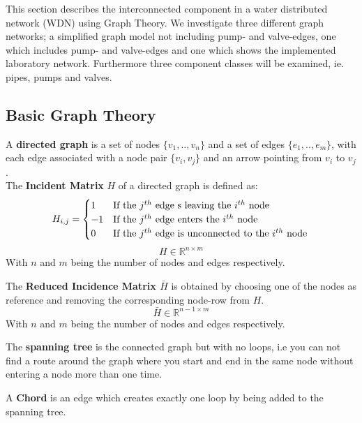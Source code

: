 This section describes the interconnected component in a water distributed network (WDN) using Graph Theory. We investigate three different graph networks; a simplified graph model not including pump- and valve-edges, one which includes pump- and valve-edges and one which shows the implemented laboratory network. Furthermore three component classes will be examined, ie. pipes, pumps and valves.


\subsection{Basic Graph Theory}

A \textbf{directed graph} is a set of nodes $ \{v_1,..,v_n\} $ and a set of edges $ \{e_1,..,e_m\} $, with each edge associated with a node pair $ \{v_i,v_j\} $ and an arrow pointing from $ v_i $ to $ v_j $. \\

The \textbf{Incident Matrix} $H$ of a directed graph is defined as:
\begin{equation*}
	H_{i,j} = \begin{cases}
		1 & \text{If the $j^{th}$ edge s leaving the $i^{th}$ node}\\
		-1 & \text{If the $j^{th}$ edge enters the $i^{th}$ node} \\
		0 & \text{If the $j^{th}$ edge is unconnected to the $i^{th}$ node} 
		
	\end{cases}\\
\end{equation*} 
\begin{equation*}
	H\in \mathbb{R}^{n\times m}
\end{equation*}
With $n$ and $m$ being the number of nodes and edges respectively.

The \textbf{Reduced Incidence Matrix $\bar{H}$} is obtained by choosing one of the nodes as reference and removing the corresponding node-row from $ H $.
\begin{equation*}
	\bar{H}\in \mathbb{R}^{n-1\times m}
\end{equation*}
With $n$ and $m$ being the number of nodes and edges respectively.

The \textbf{spanning tree} is the connected graph but with no loops, i.e you can not find a route around the graph where you start and end in the same node without entering a node more than one time. 

A \textbf{Chord} is an edge which creates exactly one loop by being added to the spanning tree. 

